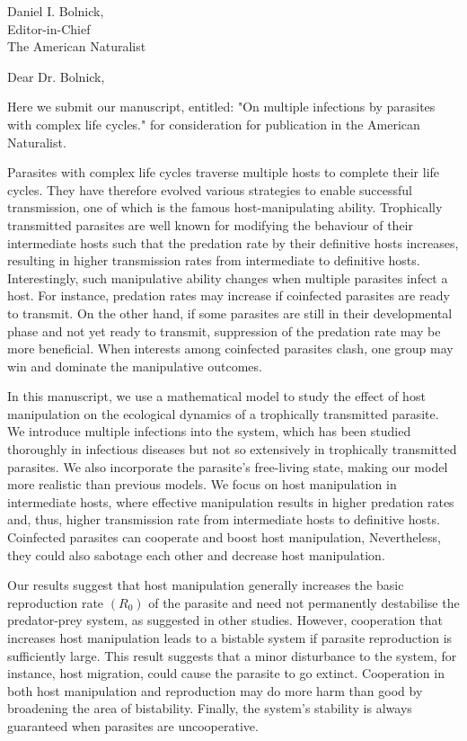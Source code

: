 \documentclass[10,DIN, pagenumber=false, parskip=half,fromalign=right, fromphone=false,fromemail=false, fromurl=false,fromlogo=true, fromrule=false]{scrlttr2}
\begin{document}
\sffamily

\begin{letter}{
\sffamily
\vspace{-0.4cm}
Daniel I. Bolnick,\\
Editor-in-Chief\\
The American Naturalist
}
\opening{\sffamily \vspace{-1cm} Dear Dr. Bolnick,}
\vspace{-0.3cm}

Here we submit our manuscript, entitled: "On multiple infections by parasites with complex life cycles." for consideration for publication in the American Naturalist.

Parasites with complex life cycles traverse multiple hosts to complete their life cycles.
They have therefore evolved various strategies to enable successful transmission, one of which is the famous host-manipulating ability.
Trophically transmitted parasites are well known for modifying the behaviour of their intermediate hosts such that the predation rate by their definitive hosts increases, resulting in higher transmission rates from intermediate to definitive hosts.
Interestingly, such manipulative ability changes when multiple parasites infect a host. 
For instance, predation rates may increase if coinfected parasites are ready to transmit. 
On the other hand, if some parasites are still in their developmental phase and not yet
ready to transmit, suppression of the predation rate may be more beneficial.
When interests among coinfected parasites clash, one group may win and dominate the manipulative outcomes.

In this manuscript, we use a mathematical model to study the effect of host manipulation on the ecological dynamics of a trophically transmitted parasite.
We introduce multiple infections into the system, which has been studied thoroughly in
infectious diseases but not so extensively in trophically transmitted parasites.
We also incorporate the parasite's free-living state, making our model more realistic than previous models.
We focus on host manipulation in intermediate hosts, where effective manipulation results in higher predation rates and, thus, higher transmission rate from intermediate hosts to definitive hosts.
Coinfected parasites can cooperate and boost host manipulation,
Nevertheless, they could also sabotage each other and decrease host manipulation.

Our results suggest that host manipulation generally increases the basic reproduction rate $(R_0)$ of the parasite and need not permanently destabilise the predator-prey system, as suggested in other studies.
However, cooperation that increases host manipulation leads to a bistable system if parasite reproduction is sufficiently large.
This result suggests that a minor disturbance to the system, for instance, host migration, could cause the parasite to go extinct.
Cooperation in both host manipulation and reproduction may do more harm than good by broadening the area of bistability.
Finally, the system's stability is always guaranteed when parasites are uncooperative.


\end{letter}
\end{document}
